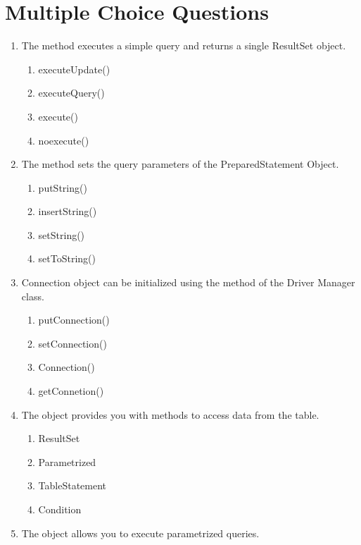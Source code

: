 \documentclass[11pt,a4paper]{article}
\begin{document}
\section*{Multiple Choice Questions}
\begin{enumerate}
\item The \underline{\hspace{2cm}} method executes a simple query and returns a single ResultSet object. 
\begin{enumerate}
\item executeUpdate()
\item executeQuery()
\item execute()
\item noexecute()
\end{enumerate}
\item The \underline{\hspace{2cm}} method sets the query parameters of the PreparedStatement Object.
\begin{enumerate}
\item putString()
\item insertString()
\item setString()
\item setToString()
\end{enumerate}
\item Connection object can be initialized using the \underline{\hspace{2cm}} method of the Driver Manager class.
\begin{enumerate}
\item putConnection()
\item setConnection()
\item Connection()
\item getConnetion()
\end{enumerate}
\item The \underline{\hspace{2cm}} object provides you with methods to access data from the table.
\begin{enumerate}
\item ResultSet 
\item Parametrized
\item TableStatement
\item Condition
\end{enumerate}
\item The \underline{\hspace{2cm}} object allows you to execute parametrized queries.
\begin{enumerate}

\end{enumerate}
\end{enumerate}
\end{document}
